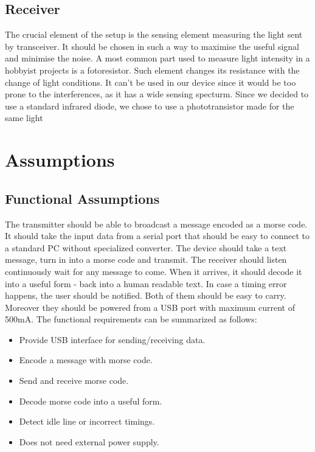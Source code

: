 \documentclass[12pt]{article}
\begin{document}
  \subsection{Receiver}
  The crucial element of the setup is the sensing element measuring the light sent by transceiver.
  It should be chosen in such a way to maximise the useful signal and minimise the noise.
  A most common part used to measure light intensity in a hobbyist projects is a fotoresistor. Such element changes its resistance with the change of light conditions. 
  It can't be used in our device since it would be too prone to the interferences, as it has a wide sensing specturm.
  Since we decided to use a standard infrared diode, we chose to use a phototransistor made for the same light 
	
	\section{Assumptions}
	\subsection{Functional Assumptions}
  The transmitter should be able to broadcast a message encoded as a morse code. It should take the input data from a serial port that should be easy to connect to a standard PC without specialized converter.
  The device should take a text message, turn in into a morse code and transmit.
  The receiver should listen continuously wait for any message to come. When it arrives, it should decode it into a useful form - back into a human readable text. In case a timing error happens, the user should be notified.
  Both of them should be easy to carry. Moreover they should be powered from a USB port with maximum current of 500mA.
  The functional requirements can be summarized as follows:
  \begin{itemize}
    \item Provide USB interface for sending/receiving data.
    \item Encode a message with morse code.
    \item Send and receive morse code.
    \item Decode morse code into a useful form.
    \item Detect idle line or incorrect timings.
    \item Does not need external power supply.
  \end{itemize}
\end{document}
